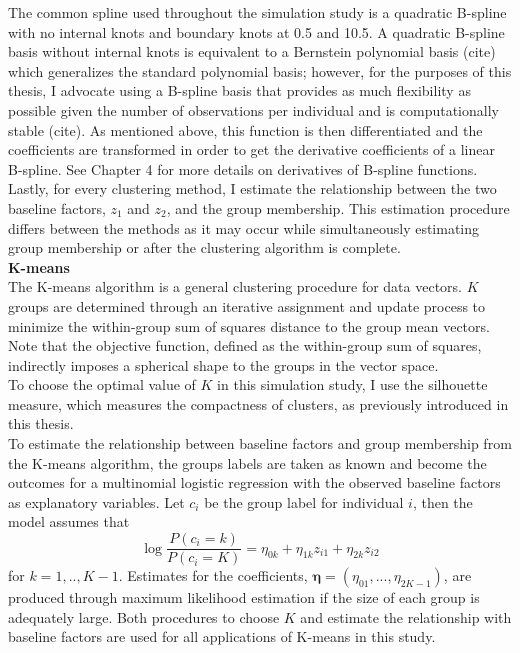 \documentclass[12pt]{article}
\newcommand{\bs}[0]{\boldsymbol}
\begin{document}
The common spline used throughout the simulation study is a quadratic B-spline with no internal knots and boundary knots at 0.5 and 10.5. A quadratic B-spline basis without internal knots is equivalent to a Bernstein polynomial basis (cite) which generalizes the standard polynomial basis; however, for the purposes of this thesis, I advocate using a B-spline basis that provides as much flexibility as possible given the number of observations per individual and is computationally stable (cite).  As mentioned above, this function is then differentiated and the coefficients are transformed in order to get the derivative coefficients of a linear B-spline. See Chapter 4 for more details on derivatives of B-spline functions.\\

Lastly, for every clustering method, I estimate the relationship between the two baseline factors, $z_{1}$ and $z_{2}$, and the group membership. This estimation procedure differs between the methods as it may occur while simultaneously estimating group membership or after the clustering algorithm is complete. \\

\noindent \textbf{K-means}\\
The K-means algorithm is a general clustering procedure for data vectors. $K$ groups are determined through an iterative assignment and update process to minimize the within-group sum of squares distance to the group mean vectors. Note that the objective function, defined as the within-group sum of squares, indirectly imposes a spherical shape to the groups in the vector space.\\

To choose the optimal value of $K$ in this simulation study, I use the silhouette measure, which measures the compactness of clusters, as previously introduced in this thesis. \\

To estimate the relationship between baseline factors and group membership from the K-means algorithm, the groups labels are taken as known and become the outcomes for a multinomial logistic regression with the observed baseline factors as explanatory variables. Let $c_{i}$ be the group label for individual $i$, then the model assumes that
$$\log\frac{P(c_{i}=k)}{P(c_{i}=K)} = \eta_{0k}+\eta_{1k}z_{i1}+\eta_{2k}z_{i2}$$
for $k=1,..,K-1$. Estimates for the coefficients, $\bs\eta = (\eta_{01},...,\eta_{2K-1})$, are produced through maximum likelihood estimation if the size of each group is adequately large. Both procedures to choose $K$ and estimate the relationship with baseline factors are used for all applications of K-means in this study.\\
\end{document}
